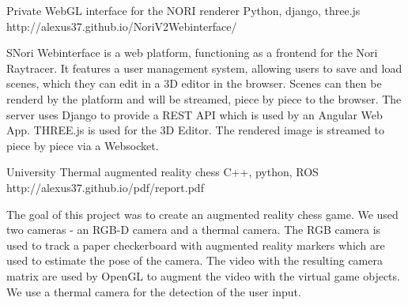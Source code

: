 \begin{cventries}
  \cventry
    {Private}
    {WebGL interface for the NORI renderer} %
    {Python, django, three.js} %
    {http://alexus37.github.io/NoriV2Webinterface/} %
    {
      \begin{cvitems} %
        \item {
        SNori Webinterface is a web platform, functioning as a frontend for the Nori Raytracer. It features a user management system, allowing users to save and load scenes, which they can edit in a 3D editor in the browser. Scenes can then be renderd by the platform and will be streamed, piece by piece to the browser. The server uses Django to provide a REST API which is used by an Angular Web App. THREE.js is used for the 3D Editor. The rendered image is streamed to piece by piece via a Websocket.
        }
      \end{cvitems}
    }
    
  \cventry
    {University}
    {Thermal augmented reality chess} %
    {C++, python, ROS} %
    {http://alexus37.github.io/pdf/report.pdf} %
    {
      \begin{cvitems} %
        \item {
        The goal of this project was to create an augmented reality chess game. We used two cameras - an RGB-D camera and a thermal camera. The RGB camera is used to track a paper checkerboard with augmented reality markers which are used to estimate the pose of the camera. The video with the resulting camera matrix are used by OpenGL to augment the video with the virtual game objects. We use a thermal camera for the detection of the user input.
        }
      \end{cvitems}
    }
\end{cventries}
